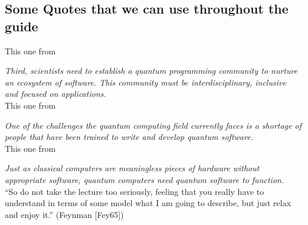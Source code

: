 \newpage
\subsection*{Some Quotes that we can use throughout the guide}

This one from \cite{WZ2017}

\emph{Third, scientists need to establish a quantum programming community to nurture an ecosystem of software. This community must be interdisciplinary, inclusive and focused on applications.}\\

This one from \cite{QSmanifesto}

\emph{One of the challenges the quantum computing field currently faces is a shortage of people that have been trained to write and develop quantum software.}\\

This one from \cite{QSmanifesto}

\emph{Just as classical computers are meaningless pieces of hardware without appropriate software, quantum computers need quantum software to function.}\\


“So do not take the lecture too seriously, feeling that you really have to
understand in terms of some model what I am going to describe, but just
relax and enjoy it.” (Feynman [Fey65])\\